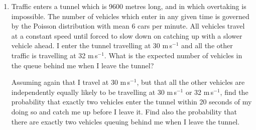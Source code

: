 \documentclass[a4, 11pt]{report}
\newlength{\qspace}
\newcounter{qnumber}
\newenvironment{question}%
 {\vspace{\qspace}
  \begin{enumerate}[\bfseries 1\quad][10]%
    \setcounter{enumi}{\value{qnumber}}%
    \item%
 }
{
  \end{enumerate}
  \filbreak
  \stepcounter{qnumber}
 }
\begin{document}
\begin{question}
Traffic enters a tunnel which is 9600 metres long, and in which overtaking
is impossible. The number of vehicles 
which enter in any given time is governed by the Poisson distribution with 
mean 6 cars per minute. All vehicles travel
at a constant speed until forced to slow down on catching up with a
slower vehicle ahead. I enter the tunnel travelling at 30
m$\,$s$^{-1}$
and all the other traffic is travelling at 32 m$\,$s$^{-1}$. What is
the expected number of vehicles in
the queue behind me when I leave the tunnel? 


Assuming again that I travel at 30 m$\,$s$^{-1}$, but that all the other
vehicles are independently equally likely to be travelling at 30 m$\,$s$^{-1}$
or 32 m$\,$s$^{-1}$, find the probability that 
 exactly two
vehicles enter the tunnel within 20 seconds of my doing so
and catch me up before I leave it.
Find also the probability that there are exactly two vehicles
queuing behind me when I leave the tunnel.


\end{question}
	
\end{document}
